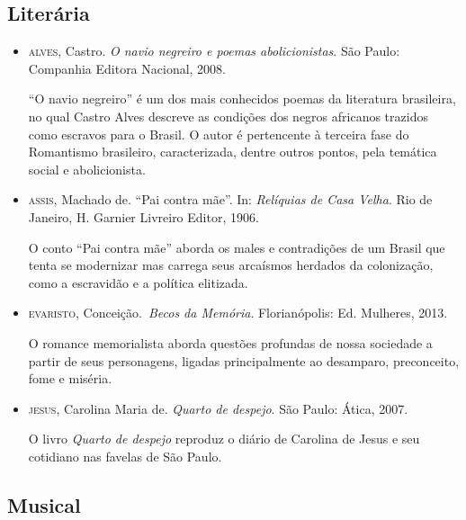 \documentclass[12pt]{extarticle}
\begin{document}
\subsection{Literária}

\begin{itemize}
\item\textsc{alves}, Castro. \textit{O navio negreiro e poemas abolicionistas}. São
  Paulo: Companhia Editora Nacional, 2008.

``O navio negreiro'' é um dos mais conhecidos poemas da literatura brasileira, 
no qual Castro Alves descreve as condições dos negros africanos 
trazidos como escravos para o Brasil. O autor é pertencente à terceira 
fase do Romantismo brasileiro, caracterizada, dentre outros pontos, 
pela temática social e abolicionista.

\item\textsc{assis}, Machado de. ``Pai contra mãe''. In: \textit{Relíquias de Casa
  Velha}. Rio de Janeiro, H. Garnier Livreiro Editor, 1906.

O conto ``Pai contra mãe'' aborda os males e contradições de um Brasil que tenta se modernizar
mas carrega seus arcaísmos herdados da colonização, como a escravidão e
a política elitizada.

\item\textsc{evaristo}, Conceição.~\textit{Becos da Memória}. Florianópolis: Ed.
  Mulheres, 2013.

O romance memorialista aborda questões profundas de nossa 
sociedade a partir de seus personagens, ligadas principalmente ao 
desamparo, preconceito, fome e miséria.

\item\textsc{jesus}, Carolina Maria de. \textit{Quarto de despejo}. São Paulo:
  Ática, 2007.

O livro \textit{Quarto de despejo} reproduz o diário de Carolina de Jesus e 
seu cotidiano nas favelas de São Paulo.
\end{itemize}

\subsection{Musical}
\end{document}

